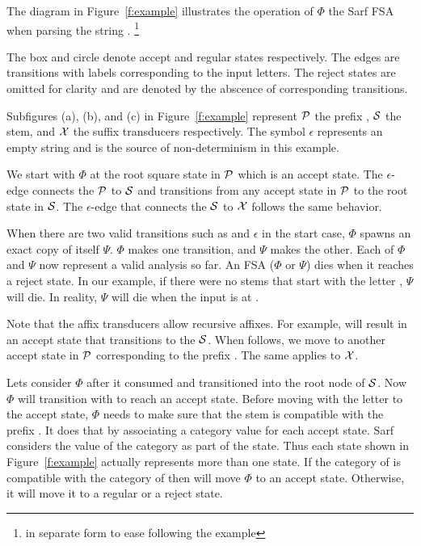 \documentclass[11pt]{article}
\begin{document}
The diagram in Figure~\ref{f:example}
illustrates the operation of $\Phi$ the Sarf FSA 
when parsing the
string .
\footnote{ 
%
in separate form to ease following the example
}

The box and circle denote accept and regular
states respectively.
The edges are transitions with labels corresponding to
the input letters.
The reject states are omitted for clarity and are denoted
by the abscence of corresponding transitions. 

Subfigures (a), (b), and (c) in Figure~\ref{f:example}
represent ${\cal P}$ the prefix ,
${\cal S}$ the stem, and ${\cal X}$ the suffix
transducers respectively. 
The symbol $\epsilon$ represents an empty string and is 
the source of non-determinism in this example. 

We start with $\Phi$ at the root square state in 
${\cal P}$ which is an accept state. 
The $\epsilon$-edge connects the ${\cal P}$
to ${\cal S}$ and transitions from any accept state
in ${\cal P}$ to the root state in ${\cal S}$.
The $\epsilon$-edge that connects the ${\cal S}$ to ${\cal X}$
follows the same behavior. 

When there are two valid transitions such as  
and $\epsilon$ in the start case, 
$\Phi$ spawns an exact copy of itself $\Psi$. 
$\Phi$ makes one transition, and $\Psi$ makes the other. 
Each of $\Phi$ and $\Psi$ now represent a valid analysis so far. 
An FSA ($\Phi$ or $\Psi$) dies when it reaches a reject state.
In our example, if there were no stems that start 
with the letter , $\Psi$ will die. 
In reality, $\Psi$ will die when the input 
is at . 

Note that the affix transducers allow recursive 
affixes. 
For example,  will result in an accept state
that transitions to the ${\cal S}$.
When  follows, we move to another accept state in 
${\cal P}$ corresponding to the prefix . 
The same applies to ${\cal X}$. 

Lets consider $\Phi$ after it consumed  
and transitioned into the root node of ${\cal S}$.
Now $\Phi$ will transition with  to reach an accept 
state. 
Before moving with the letter  to the accept state,
$\Phi$ needs to make sure that the stem  is compatible
with the prefix . 
It does that by associating a category value for each accept state. 
Sarf considers the value of the category as part of the state.
Thus each state shown in Figure~\ref{f:example} actually represents
more than one state. 
If the category of  is compatible with the category of
 then  will move $\Phi$ to an accept state. 
Otherwise, it will move it to a regular or a reject state. 
\end{document}
